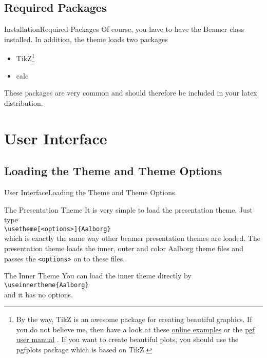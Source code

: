 \documentclass[10pt]{beamer}
\newcommand{\chref}[2]{%
  \href{#1}{{\usebeamercolor[bg]{Aalborg}#2}}%
}
\begin{document}
\subsection{Required Packages}
\begin{frame}{Installation}{Required Packages}
  Of course, you have to have the Beamer class installed. In addition, the theme loads two packages
  \begin{itemize}
    \item TikZ\footnote{By the way, TikZ is an awesome package for creating beautiful graphics. If you do not believe me, then have a look at these \chref{http://www.texample.net/tikz/examples/}{online examples} or the \chref{http://tug.ctan.org/tex-archive/graphics/pgf/base/doc/generic/pgf/pgfmanual.pdf}{pgf user manual}. If you want to create beautiful plots, you should use the pgfplots package which is based on TikZ.}
    \item calc
  \end{itemize}
  These packages are very common and should therefore be included in your latex distribution.
\end{frame}

\section{User Interface}
\subsection{Loading the Theme and Theme Options}
\begin{frame}{User Interface}{Loading the Theme and Theme Options}
  \begin{block}{The Presentation Theme}
    It is very simple to load the presentation theme. Just type\\
    {\tt \textbackslash usetheme[<options>]\{Aalborg\}}\\
    which is exactly the same way other beamer presentation themes are loaded. The presentation theme loads the inner, outer and color Aalborg theme files and passes the {\tt <options>} on to these files.
  \end{block}
  \begin{block}{The Inner Theme}
    You can load the inner theme directly by\\
    {\tt \textbackslash useinnertheme\{Aalborg\}}\\
    and it has no options.
  \end{block}
\end{frame}
\end{document}
